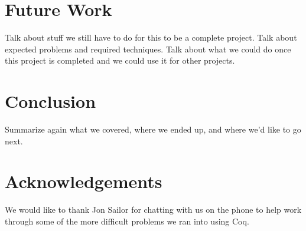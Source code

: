 \documentclass[a4paper]{article}
\theoremstyle{plain}
\theoremstyle{definition}
\begin{document}
\section{Future Work}
\label{sec:future}

Talk about stuff we still have to do for this to be a complete project.  Talk
about expected problems and required techniques.  Talk about what we could do
once this project is completed and we could use it for other projects.

\section{Conclusion}
\label{sec:conclusion}

Summarize again what we covered, where we ended up, and where we'd like to go
next.

\section*{Acknowledgements}

We would like to thank Jon Sailor for chatting with us on the phone to help work
through some of the more difficult problems we ran into using Coq.



\end{document}
